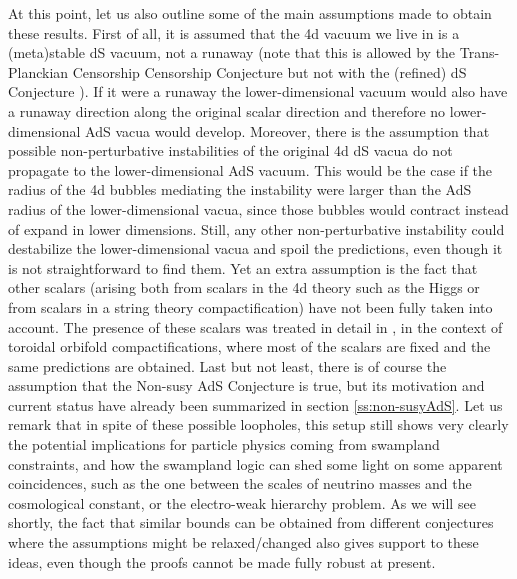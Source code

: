 \documentclass[11pt,a4paper]{article}
\begin{document}
At this point, let us also outline some of the main assumptions made to obtain these results. First of all, it is assumed that the 4d vacuum we live in is a (meta)stable dS vacuum, not a runaway  (note that this is allowed by the Trans-Planckian Censorship Censorship Conjecture \cite{Bedroya:2019snp} but not with the (refined) dS Conjecture \cite{dS1,dS2, dS3}). If it were a runaway the lower-dimensional vacuum would also have a runaway direction along the original scalar direction and therefore no lower-dimensional AdS vacua would develop. Moreover, there is the assumption that possible non-perturbative instabilities of the original 4d dS vacua do not propagate to the lower-dimensional AdS vacuum. This would be the case if the radius of the 4d bubbles mediating the instability were larger than the AdS radius of the lower-dimensional vacua, since those bubbles would contract instead of expand in lower dimensions. %
Still, any other non-perturbative instability could destabilize the lower-dimensional vacua and spoil the predictions, even though it is not straightforward to find them. Yet an extra assumption is the fact that other scalars (arising both from scalars in the 4d theory such as the Higgs or from scalars in a string theory compactification) have not been fully taken into account. The presence of these scalars was treated in detail in \cite{Gonzalo:2018tpb}, in the context of toroidal orbifold compactifications, where most of the scalars are fixed and the same predictions are obtained. Last but not least, there is of course the assumption that the Non-susy AdS Conjecture is true, but its motivation and current status have already been summarized in section \ref{ss:non-susyAdS}. Let us remark that in spite of these possible loopholes, this setup still shows very clearly the potential implications for particle physics coming from swampland constraints, and how the swampland logic can shed some light on some apparent coincidences, such as the one between the scales of neutrino masses and the cosmological constant, or the electro-weak hierarchy problem. As we will see shortly, the fact that similar bounds can be obtained from different conjectures where the assumptions might be relaxed/changed also gives support to these ideas, even though the proofs cannot be made fully robust at present.
\end{document}
